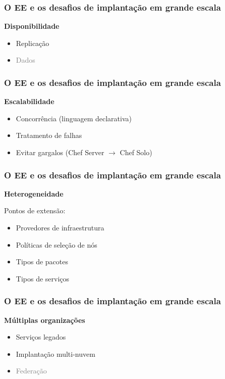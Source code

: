 \documentclass{beamer}
\newcommand\subtitulo[1]{{\large \textbf{#1}}}
\begin{document}

\begin{frame}
\frametitle{O EE e os desafios de implantação em grande escala}

\subtitulo{Disponibilidade}

\begin{itemize}
\item Replicação
\item \textcolor{gray}{Dados}
\end{itemize}

\end{frame}



\begin{frame}
\frametitle{O EE e os desafios de implantação em grande escala}

\subtitulo{Escalabilidade}

\begin{itemize}
\item Concorrência (linguagem declarativa)
\item Tratamento de falhas
\item Evitar gargalos (Chef Server $\rightarrow$ Chef Solo)
\end{itemize}

\end{frame}



\begin{frame}
\frametitle{O EE e os desafios de implantação em grande escala}

\subtitulo{Heterogeneidade}

\vspace{1cm}

Pontos de extensão:

\begin{itemize}
\item Provedores de infraestrutura
\item Políticas de seleção de nós
\item Tipos de pacotes
\item Tipos de serviços
\end{itemize}

\end{frame}



\begin{frame}
\frametitle{O EE e os desafios de implantação em grande escala}

\subtitulo{Múltiplas organizações}

\begin{itemize}
\item Serviços legados
\item Implantação multi-nuvem
\item \textcolor{gray}{Federação}
\end{itemize}

\end{frame}
\end{document}
